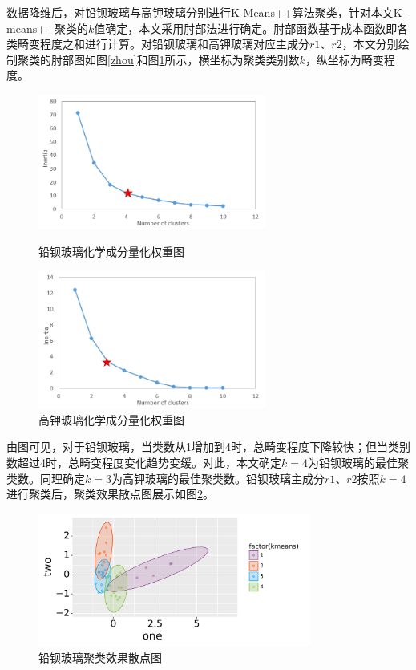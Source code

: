 \documentclass[withoutpreface,bwprint]{cumcmthesis} %
\begin{document}
数据降维后，对铅钡玻璃与高钾玻璃分别进行K-Means++算法聚类，针对本文K-means++聚类的$k$值确定，本文采用肘部法进行确定。肘部函数基于成本函数即各类畸变程度之和进行计算。对铅钡玻璃和高钾玻璃对应主成分$r1$、$r2$，本文分别绘制聚类的肘部图如图\ref{zhou}和图\ref{zb}所示，横坐标为聚类类别数$k$，纵坐标为畸变程度。
\begin{figure}[H]
  \centering
  \begin{minipage}[t]{0.48\textwidth}
    \centering
    \includegraphics[width=7.5cm]{figure/肘部4}
    \caption{铅钡玻璃化学成分量化权重图}
    \label{zhou}
  \end{minipage}
  \begin{minipage}[t]{0.48\textwidth}
    \centering
    \includegraphics[width=7.5cm]{figure/肘部1}
    \caption{高钾玻璃化学成分量化权重图}
    \label{zb}
  \end{minipage}
\end{figure}

由图可见，对于铅钡玻璃，当类数从1增加到4时，总畸变程度下降较快；但当类别数超过4时，总畸变程度变化趋势变缓。对此，本文确定$k=4$为铅钡玻璃的最佳聚类数。同理确定$k=3$为高钾玻璃的最佳聚类数。铅钡玻璃主成分$r1$、$r2$按照$k=4$进行聚类后，聚类效果散点图展示如图\ref{km}。

\begin{figure}[H]
  \centering
  \includegraphics[width=0.8\textwidth]{figure/散点}
  \caption{铅钡玻璃聚类效果散点图}
  \label{km}
\end{figure}
\end{document}
